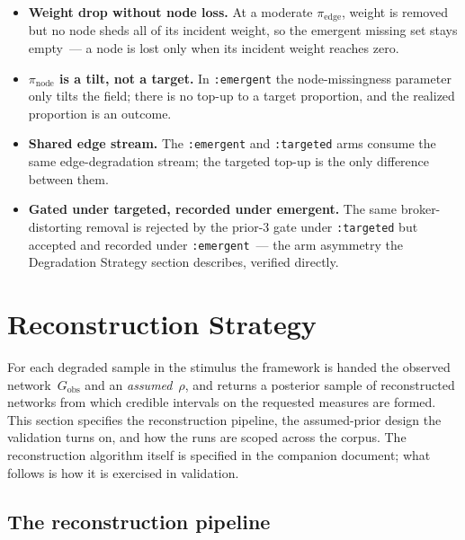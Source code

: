 \documentclass[11pt]{article}
\newcommand{\Gobs}{G_{\text{obs}}}
\newcommand{\pinode}{\pi_{\text{node}}}
\newcommand{\piedge}{\pi_{\text{edge}}}
\begin{document}
\begin{itemize}[leftmargin=*, itemsep=3pt]
  \item \textbf{Weight drop without node loss.} At a moderate $\piedge$, weight is removed but no node sheds all of its incident weight, so the emergent missing set stays empty~--- a node is lost only when its incident weight reaches zero.
  \item \textbf{$\pinode$ is a tilt, not a target.} In \texttt{:emergent} the node-missingness parameter only tilts the field; there is no top-up to a target proportion, and the realized proportion is an outcome.
  \item \textbf{Shared edge stream.} The \texttt{:emergent} and \texttt{:targeted} arms consume the same edge-degradation stream; the targeted top-up is the only difference between them.
  \item \textbf{Gated under targeted, recorded under emergent.} The same broker-distorting removal is rejected by the prior-3 gate under \texttt{:targeted} but accepted and recorded under \texttt{:emergent}~--- the arm asymmetry the Degradation Strategy section describes, verified directly.
\end{itemize}

\section{Reconstruction Strategy}

For each degraded sample in the stimulus the framework is handed the observed network~$\Gobs$ and an \emph{assumed}~$\rho$, and returns a posterior sample of reconstructed networks from which credible intervals on the requested measures are formed. This section specifies the reconstruction pipeline, the assumed-prior design the validation turns on, and how the runs are scoped across the corpus. The reconstruction algorithm itself is specified in the companion document; what follows is how it is exercised in validation.

\subsection{The reconstruction pipeline}
\end{document}
